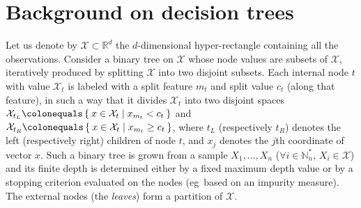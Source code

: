 \section{Background on decision trees}
\label{ocrf:sec:background}
Let us denote by $\mathcal{X} \subset \mathbb{R}^d$ the $d$-dimensional
hyper-rectangle containing all the observations.  Consider a binary tree on
$\mathcal{X}$ whose node values are subsets of $\mathcal{X}$, iteratively
produced by splitting $\mathcal{X}$ into two disjoint subsets.  Each internal
node $t$ with value $\mathcal{X}_t$ is labeled with a split feature $m_t$ and
split value $c_t$ (along that feature), in such a way that it divides
$\mathcal{X}_t$ into two disjoint spaces $\mathcal{X}_{t_L} \colonequals \Set{x
\in \mathcal{X}_t | x_{m_t} < c_t}$ and $\mathcal{X}_{t_R} \colonequals \Set{x
\in \mathcal{X}_t | x_{m_t} \ge c_t}$, where $t_L$ (respectively $t_R$) denotes
the left (respectively right) children of node $t$, and $x_j$ denotes the $j$th
coordinate of vector $x$. Such a binary tree is grown from a sample $ X_1,
\ldots,  X_n$ ($\forall i\in\mathbb{N}_n^*$, $ X_i \in \mathcal{X}$) and its
finite depth is determined either by a fixed maximum depth value or by a
stopping criterion evaluated on the nodes (\acs{eg}~based on an impurity
measure).  The external nodes (the \emph{leaves}) form a partition of
$\mathcal{X}$.
